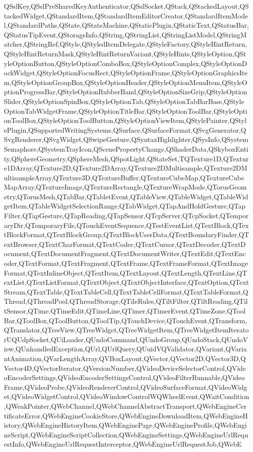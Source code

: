 {{QSslKey,QSslPreSharedKeyAuthenticator,QSslSocket,QStack,QStackedLayout,QStackedWidget,QStandardItem,QStandardItemEditorCreator,QStandardItemModel,QStandardPaths,QState,QStateMachine,QStaticPlugin,QStaticText,QStatusBar,QStatusTipEvent,QStorageInfo,QString,QStringList,QStringListModel,QStringMatcher,QStringRef,QStyle,QStyledItemDelegate,QStyleFactory,QStyleHintReturn,QStyleHintReturnMask,QStyleHintReturnVariant,QStyleHints,QStyleOption,QStyleOptionButton,QStyleOptionComboBox,QStyleOptionComplex,QStyleOptionDockWidget,QStyleOptionFocusRect,QStyleOptionFrame,QStyleOptionGraphicsItem,QStyleOptionGroupBox,QStyleOptionHeader,QStyleOptionMenuItem,QStyleOptionProgressBar,QStyleOptionRubberBand,QStyleOptionSizeGrip,QStyleOptionSlider,QStyleOptionSpinBox,QStyleOptionTab,QStyleOptionTabBarBase,QStyleOptionTabWidgetFrame,QStyleOptionTitleBar,QStyleOptionToolBar,QStyleOptionToolBox,QStyleOptionToolButton,QStyleOptionViewItem,QStylePainter,QStylePlugin,QSupportedWritingSystems,QSurface,QSurfaceFormat,QSvgGenerator,QSvgRenderer,QSvgWidget,QSwipeGesture,QSyntaxHighlighter,QSysInfo,QSystemSemaphore,QSystemTrayIcon,QScenePropertyChange,QShaderData,QSkyboxEntity,QSphereGeometry,QSphereMesh,QSpotLight,QStateSet,TQTexture1D,QTexture1DArray,QTexture2D,QTexture2DArray,QTexture2DMultisample,QTexture2DMultisampleArray,QTexture3D,QTextureBuffer,QTextureCubeMap,QTextureCubeMapArray,QTextureImage,QTextureRectangle,QTextureWrapMode,QTorusGeometry,QTorusMesh,QTabBar,QTabletEvent,QTableView,QTableWidget,QTableWidgetItem,QTableWidgetSelectionRange,QTabWidget,QTapAndHoldGesture,QTapFilter,QTapGesture,QTapReading,QTapSensor,QTcpServer,QTcpSocket,QTemporaryDir,QTemporaryFile,QTouchEventSequence,QTestEventList,QTextBlock,QTextBlockFormat,QTextBlockGroup,QTextBlockUserData,QTextBoundaryFinder,QTextBrowser,QTextCharFormat,QTextCodec,QTextCursor,QTextDecoder,QTextDocument,QTextDocumentFragment,QTextDocumentWriter,QTextEdit,QTextEncoder,QTextFormat,QTextFragment,QTextFrame,QTextFrameFormat,QTextImageFormat,QTextInlineObject,QTextItem,QTextLayout,QTextLength,QTextLine,QTextList,QTextListFormat,QTextObject,QTextObjectInterface,QTextOption,QTextStream,QTextTable,QTextTableCell,QTextTableCellFormat,QTextTableFormat,QThread,QThreadPool,QThreadStorage,QTileRules,QTiltFilter,QTiltReading,QTiltSensor,QTime,QTimeEdit,QTimeLine,QTimer,QTimerEvent,QTimeZone,QToolBar,QToolBox,QToolButton,QToolTip,QTouchDevice,QTouchEvent,QTransform,QTranslator,QTreeView,QTreeWidget,QTreeWidgetItem,QTreeWidgetItemIteratorUQUdpSocket,QUiLoader,QUndoCommand,QUndoGroup,QUndoStack,QUndoView,QUnhandledException,QUrl,QUrlQuery,QUuidVQValidator,QVariant,QVariantAnimation,QVarLengthArray,QVBoxLayout,QVector,QVector2D,QVector3D,QVector4D,QVectorIterator,QVersionNumber,QVideoDeviceSelectorControl,QVideoEncoderSettings,QVideoEncoderSettingsControl,QVideoFilterRunnable,QVideoFrame,QVideoProbe,QVideoRendererControl,QVideoSurfaceFormat,QVideoWidget,QVideoWidgetControl,QVideoWindowControlWQWheelEvent,QWaitCondition,QWeakPointer,QWebChannel,QWebChannelAbstractTransport,QWebEngineCertificateError,QWebEngineCookieStore,QWebEngineDownloadItem,QWebEngineHistory,QWebEngineHistoryItem,QWebEnginePage,QWebEngineProfile,QWebEngineScript,QWebEngineScriptCollection,QWebEngineSettings,QWebEngineUrlRequestInfo,QWebEngineUrlRequestInterceptor,QWebEngineUrlRequestJob,QWebE}}
